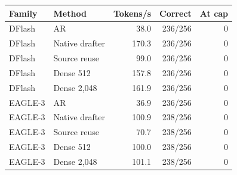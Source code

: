 \begin{tabular}{llrrr}
\toprule
Family & Method & Tokens/s & Correct & At cap \\
\midrule
DFlash & AR & 38.0 & 236/256 & 0 \\
DFlash & Native drafter & 170.3 & 236/256 & 0 \\
DFlash & Source reuse & 99.0 & 236/256 & 0 \\
DFlash & Dense 512 & 157.8 & 236/256 & 0 \\
DFlash & Dense 2,048 & 161.9 & 236/256 & 0 \\
EAGLE-3 & AR & 36.9 & 236/256 & 0 \\
EAGLE-3 & Native drafter & 100.9 & 238/256 & 0 \\
EAGLE-3 & Source reuse & 70.7 & 238/256 & 0 \\
EAGLE-3 & Dense 512 & 100.0 & 238/256 & 0 \\
EAGLE-3 & Dense 2,048 & 101.1 & 238/256 & 0 \\
\bottomrule
\end{tabular}
